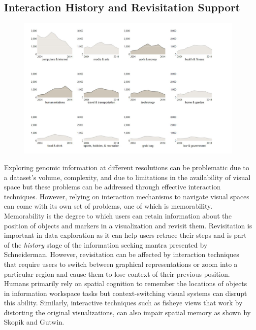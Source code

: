 \subsection{Interaction History and Revisitation Support}

\begin{figure}
  \centering
  \includegraphics[width=0.95\linewidth]{images/ch_2_interaction_history.JPG}
  \label{fig:ch_2_interaction_history}
\end{figure}


Exploring genomic information at different resolutions can be problematic due to a dataset's volume, complexity, and due to limitations in the availability of visual space but these problems can be addressed through effective interaction techniques. However, relying on interaction mechanisms to navigate visual spaces can come with its own set of problems, one of which is memorability. Memorability is the degree to which users can retain information about the position of objects and markers in a visualization and revisit them. Revisitation is important in data exploration as it can help users retrace their steps and is part of the \textit{history} stage of the information seeking mantra presented by Schneiderman\cite{Shneiderman96theeyes}. However, revisitation can be affected by interaction techniques that require users to switch between graphical representations or zoom into a particular region and cause them to lose context of their previous position. Humans primarily rely on spatial cognition to remember the locations of objects in information workspace tasks but context-switching visual systems can disrupt this ability\cite{datamountain}. Similarly, interactive techniques such as fisheye views that work by distorting the original visualizations, can also impair spatial memory as shown by Skopik and Gutwin\cite{gutwin2003finding}. 


